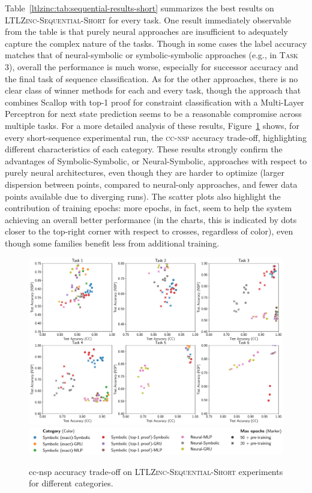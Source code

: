 Table~\ref{ltlzinc:tab:sequential-results-short} summarizes the best results on \textsc{LTLZinc-Sequential-Short} for every task. One result immediately observable from the table is that purely neural approaches are insufficient to adequately capture the complex nature of the tasks. Though in some cases the label accuracy matches that of neural-symbolic or symbolic-symbolic approaches (e.g., in \textsc{Task 3}), overall the performance is much worse, especially for successor accuracy and the final task of sequence classification. As for the other approaches, there is no clear class of winner methods for each and every task, though the approach that combines Scallop with top-1 proof for constraint classification with a Multi-Layer Perceptron for next state prediction seems to be a reasonable compromise across multiple tasks.
%
For a more detailed analysis of these results, Figure~\ref{ltlzinc:fig:sequential-tradeoff-short} shows, for every short-sequence experimental run, the \textsc{cc}-\textsc{nsp} accuracy trade-off, highlighting different characteristics of each category. These results strongly confirm the advantages of Symbolic-Symbolic, or Neural-Symbolic, approaches with respect to purely neural architectures, even though they are harder to optimize (larger dispersion between points, compared to neural-only approaches, and fewer data points available due to diverging runs). The scatter plots also highlight the contribution of training epochs: more epochs, in fact, seem to help the system achieving an overall better performance (in the charts, this is indicated by dots closer to the top-right corner with respect to crosses, regardless of color), even though some families benefit less from additional training.
%
\begin{figure}
	\centering
	\includegraphics[width=1.0\textwidth]{imgs/ltlzinc/const-vs-succ-short.pdf}
	\includegraphics[width=1.0\textwidth]{imgs/ltlzinc/const-vs-succ_legend.pdf}
	\caption[\textsc{cc}--\textsc{nsp} accuracy trade-off on \textsc{LTLZinc-Sequential-Short}]{{\sc cc}-{\sc nsp} accuracy trade-off on \textsc{LTLZinc-Sequential-Short} experiments for different categories.} %
\label{ltlzinc:fig:sequential-tradeoff-short}
\end{figure}
